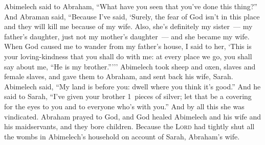 \begin{inparaenum}
   Abimelech said to Abraham, ``What have you seen that you've done this thing?''%
   And Abraman said, ``Because I've said, `Surely, the fear of God isn't in this place and they will kill me because of my wife.%
   Also, she's definitely my sister~--- my father's daughter, just not my mother's daughter~--- and she became my wife.%
   When God caused me to wander from my father's house, I said to her, `This is your loving-kindness that you shall do with me: at every place we go, you shall say about me, ``He is my brother.''\thinspace'\thinspace''%
   Abimelech took sheep and oxen, slaves and female slaves, and gave them to Abraham, and sent back his wife, Sarah.%
   Abimelech said, ``My land is before you: dwell where you think it's good.''%
   And he said to Sarah, ``I've given your brother 1~pieces of silver; let that be a covering for the eyes to you and to everyone who's with you.'' And by all this she was vindicated.%
   Abraham prayed to God, and God healed Abimelech and his wife and his maidservants, and they bore children.\understood%
   Because the \textsc{Lord} had tightly shut all the wombs in Abimelech's household on account of Sarah, Abraham's wife.%
\end{inparaenum}

